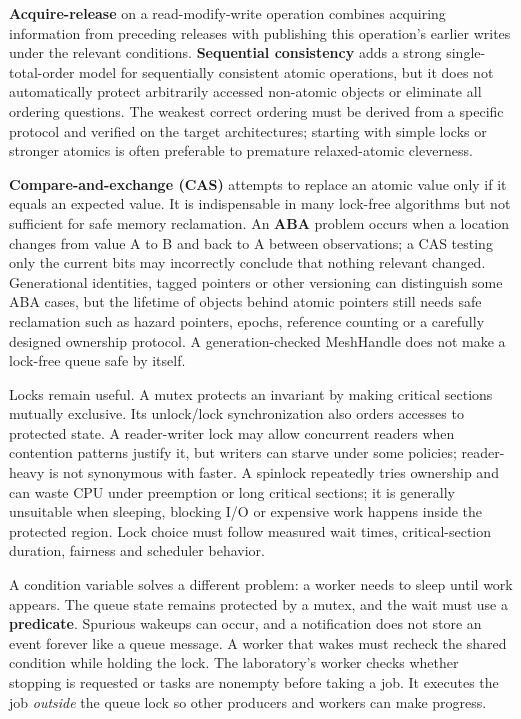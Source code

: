 \textbf{Acquire-release} on a read-modify-write operation combines acquiring information from preceding releases with publishing this operation's earlier writes under the relevant conditions. \textbf{Sequential consistency} adds a strong single-total-order model for sequentially consistent atomic operations, but it does not automatically protect arbitrarily accessed non-atomic objects or eliminate all ordering questions. The weakest correct ordering must be derived from a specific protocol and verified on the target architectures; starting with simple locks or stronger atomics is often preferable to premature relaxed-atomic cleverness.

\textbf{Compare-and-exchange (CAS)} attempts to replace an atomic value only if it equals an expected value. It is indispensable in many lock-free algorithms but not sufficient for safe memory reclamation. An \textbf{ABA} problem occurs when a location changes from value A to B and back to A between observations; a CAS testing only the current bits may incorrectly conclude that nothing relevant changed. Generational identities, tagged pointers or other versioning can distinguish some ABA cases, but the lifetime of objects behind atomic pointers still needs safe reclamation such as hazard pointers, epochs, reference counting or a carefully designed ownership protocol. A generation-checked MeshHandle does not make a lock-free queue safe by itself.

Locks remain useful. A mutex protects an invariant by making critical sections mutually exclusive. Its unlock/lock synchronization also orders accesses to protected state. A reader-writer lock may allow concurrent readers when contention patterns justify it, but writers can starve under some policies; reader-heavy is not synonymous with faster. A spinlock repeatedly tries ownership and can waste CPU under preemption or long critical sections; it is generally unsuitable when sleeping, blocking I/O or expensive work happens inside the protected region. Lock choice must follow measured wait times, critical-section duration, fairness and scheduler behavior.

A condition variable solves a different problem: a worker needs to sleep until work appears. The queue state remains protected by a mutex, and the wait must use a \textbf{predicate}. Spurious wakeups can occur, and a notification does not store an event forever like a queue message. A worker that wakes must recheck the shared condition while holding the lock. The laboratory's worker checks whether stopping is requested or tasks are nonempty before taking a job. It executes the job \emph{outside} the queue lock so other producers and workers can make progress.

